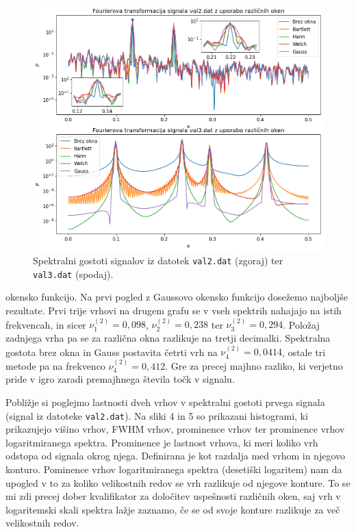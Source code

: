 \documentclass[slovene,11pt,a4paper]{article}
\begin{document}
\begin{figure}[h!]
\centering
\includegraphics[width=12cm]{slika3.png}
\caption{Spektralni gostoti signalov iz datotek \texttt{val2.dat} (zgoraj) ter \texttt{val3.dat} (spodaj).}
\end{figure}

\newpage

\noindent okensko funkcijo. Na prvi pogled z Gaussovo okensko funkcijo dosežemo najboljše rezultate. Prvi trije vrhovi na drugem grafu se v vseh spektrih nahajajo na istih frekvencah, in sicer $\nu_1^{(2)} = 0,098$, $\nu_2^{(2)} = 0,238$ ter $\nu_3^{(2)} = 0,294$. Položaj zadnjega vrha pa se za različna okna razlikuje na tretji decimalki. Spektralna gostota brez okna in Gauss postavita četrti vrh na $\nu_4^{(2)} = 0,0414$, ostale tri metode pa na frekvenco $\nu_4^{(2)} = 0,412$. Gre za precej majhno razliko, ki verjetno pride v igro zaradi premajhnega števila točk v signalu.

Pobližje si poglejmo lastnosti dveh vrhov v spektralni gostoti prvega signala (signal iz datoteke \texttt{val2.dat}). Na sliki 4 in 5 so prikazani histogrami, ki prikazujejo višino vrhov, FWHM vrhov, prominence vrhov ter prominence vrhov logaritmiranega spektra. Prominence je lastnost vrhova, ki meri koliko vrh odstopa od signala okrog njega. Definirana je kot razdalja med vrhom in njegovo konturo. Pominence vrhov logaritmiranega spektra (desetiški logaritem) nam da upogled v to za koliko velikostnih redov se vrh razlikuje od njegove konture. To se mi zdi precej dober kvalifikator za določitev uspešnosti različnih oken, saj vrh v logaritemski skali spektra lažje zaznamo, če se od svoje konture razlikuje za več velikostnih redov.
\end{document}
